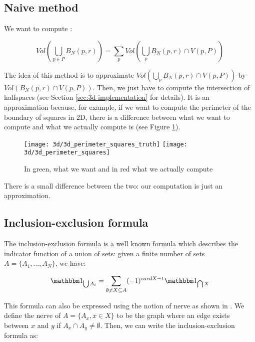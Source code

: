 \subsection{Naive method}
We want to compute :

\begin{equation}
    Vol(\bigcup_{p \in P} B_N(p, r)) = \sum_p Vol(\bigcup_p B_N(p, r) \cap V(p, P))
\end{equation}

The idea of this method is to approximate $ Vol(\bigcup_p B_N(p, r) \cap V(p,
P)) $ by $ Vol(B_N(p, r) \cap V(p, P)) $. Then, we just have to compute the
intersection of halfspaces (see Section \ref{sec:3d-implementation} for
details). It is an approximation because, for example, if we want to compute the
perimeter of the boundary of squares in 2D, there is a difference between what
we want to compute and what we actually compute is (see Figure
\ref{fig:3d-inclusion-exclusion-squares}).

\begin{figure}[h]
    \centering

    \texttt{[image: 3d/3d\_perimeter\_squares\_truth]}
    \hspace{2cm}
    \texttt{[image: 3d/3d\_perimeter\_squares]}
    \caption{In green, what we want and in red what we actually compute}
    \label{fig:3d-inclusion-exclusion-squares}
\end{figure}

There is a small difference between the two: our computation is just
an approximation.


\subsection{Inclusion-exclusion formula}

The inclusion-exclusion formula is a well known formula which describes the
indicator function of a union of sets: given a finite number of sets $ A = \{
A_1, \ldots, A_N \} $, we have:

\begin{equation}
    \indicator{\bigcup A_i} = \sum_{\emptyset \neq X \subseteq A} (-1)^{card X -
        1} \indicator{\bigcap X}
\end{equation}

This formula can also be expressed using the notion of nerve as shown in
\cite{attali2007inclusion}. We define the nerve of $ A = \{ A_x, x \in X \} $
to be the graph where an edge exists between $ x $ and $ y $ if $ A_x \cap A_y
\neq \emptyset $. Then, we can write the inclusion-exclusion formula as:

